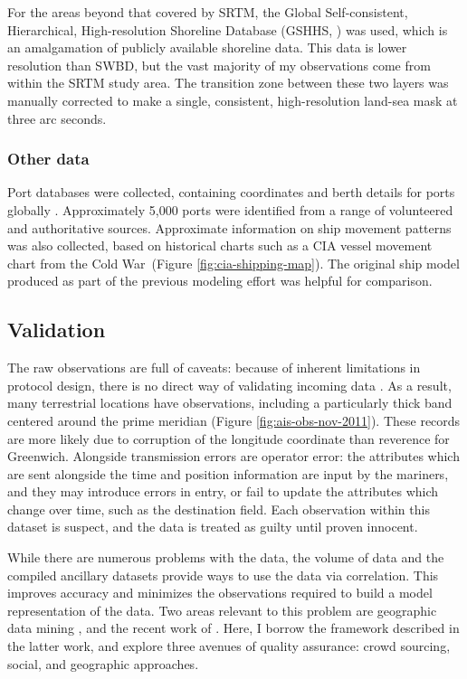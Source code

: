 \documentclass[12pt,letterpaper]{article}
\begin{document}
For the areas beyond that covered by SRTM, the Global Self-consistent, Hierarchical, High-resolution Shoreline Database (GSHHS, \citealp{wessel1996global}) was used, which is an amalgamation of publicly available shoreline data. This data is lower resolution than SWBD, but the vast majority of my observations come from within the SRTM study area. The transition zone between these two layers was manually corrected to make a single, consistent, high-resolution land-sea mask at three arc seconds.

\subsubsection{Other data}
Port databases were collected, containing coordinates and berth details for ports globally \citep{Halpern2008,worldportindex}. Approximately 5,000 ports were identified %
from a range of volunteered and authoritative sources.  Approximate information on ship movement patterns was also collected, based on historical charts such as a CIA vessel movement chart from the Cold War~(Figure \ref{fig:cia-shipping-map}). The original ship model produced as part of the previous modeling effort \citep{Halpern2008} was helpful for comparison.

\subsection{Validation}

The raw observations are full of caveats: because of inherent limitations in protocol design, there is no direct way of validating incoming data \citep{RaymondInPress}. %
 As a result, many terrestrial locations have observations, including a particularly thick band centered around the prime meridian (Figure \ref{fig:ais-obs-nov-2011}). These records are more likely due to corruption of the longitude coordinate than reverence for Greenwich. Alongside transmission errors are operator error: the attributes which are sent alongside the time and position information are input by the mariners, and they may introduce errors in entry, or fail to update the attributes which change over time, such as the destination field. Each observation within this dataset is suspect, and the data is treated as guilty until proven innocent.

While there are numerous problems with the data, the volume of data and the compiled ancillary datasets provide ways to use the data via correlation.  This improves accuracy and minimizes the observations required to build a model representation of the data. Two areas relevant to this problem are geographic data mining \citep{miller2009geographic}, and the recent work of \cite{goodchildli2012}. Here, I borrow the framework described in the latter work, and explore three avenues of quality assurance: crowd sourcing, social, and geographic approaches.
\end{document}
